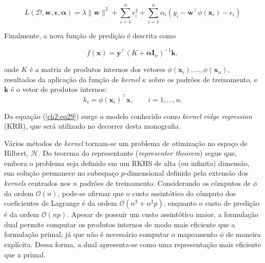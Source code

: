 \begin{equation}
    \label{ch2:27}
    L(\mathcal{D}, \mathbf{w}, \boldsymbol{\epsilon}, \boldsymbol{\alpha}) = \lambda \|\mathbf{w}\|^2 + \sum_{i=1}^{n}{\epsilon_i^{2} + \sum_{i=1}^{n} \alpha_i(y_i - \mathbf{w}^{\top}\phi(\mathbf{x}_i) - \epsilon_i)}
\end{equation}

Finalmente, a nova função de predição é descrita como

\begin{equation}
    \label{ch2:eq29}
    f(\mathbf{x}) = \mathbf{y}^{\top}(K + \boldsymbol{\alpha}\mathbf{I}_n)^{-1}\mathbf{k},
\end{equation}

\noindent onde $K$ é a matriz de produtos internos dos vetores $\phi(\mathbf{x}_i), \ldots, \phi(\mathbf{x}_n)$, resultados da aplicação da função de \textit{kernel} $\kappa$ sobre os padrões de treinamento, e $\mathbf{k}$ é o vetor de produtos internos: \[ k_i = \phi(\mathbf{x}_i)^{\top}\mathbf{x}, \quad\quad i = 1,\ldots,n. \]

Da equação (\ref{ch2:eq29}) surge o modelo conhecido como \textit{kernel ridge regression} (KRR), que será utilizado no decorrer desta monografia.

Vários métodos de \textit{kernel} tornam-se um problema de otimização no espaço de Hilbert, $\mathcal{H}$. Do teorema do representante (\textit{representer theorem}) \cite{aronszajn1950,scholkopf2001} segue que, embora o problema seja definido em um RKHS de alta (ou infinita) dimensão, sua solução permanece no subespaço $p$-dimensional definido pela extensão dos \textit{kernels} centrados nos $n$ padrões de treinamento. Considerando os cômputos de $\phi$ da ordem $\mathcal{O}(n)$, pode-se afirmar que o custo assintótico do cômputo dos coeficientes de Lagrange é da ordem $\mathcal{O}(n^3 + n^2p)$, enquanto o custo de predição é da ordem $\mathcal{O}(np)$. Apesar de possuir um custo assintótico maior, a formulação dual permite computar os produtos internos de modo mais eficiente que a formulação primal, já que não é necessário computar o mapeamento $\phi$ de maneira explícita. Dessa forma, a dual apresenta-se como uma representação mais eficiente que a primal.



